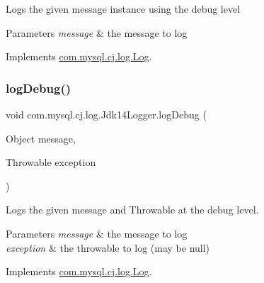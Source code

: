 Logs the given message instance using the \textquotesingle{}debug\textquotesingle{} level


\begin{DoxyParams}{Parameters}
{\em message} & the message to log \\
\hline
\end{DoxyParams}


Implements \mbox{\hyperlink{interfacecom_1_1mysql_1_1cj_1_1log_1_1_log_a6149f715730ea0615ef6e341dd3e8a39}{com.\+mysql.\+cj.\+log.\+Log}}.

\mbox{\label{classcom_1_1mysql_1_1cj_1_1log_1_1_jdk14_logger_a3be3b804fac31009afe4dcbc9a399027}} 
\subsubsection{\texorpdfstring{log\+Debug()}{logDebug()}\hspace{0.1cm}{\footnotesize\ttfamily [2/2]}}
{\footnotesize\ttfamily void com.\+mysql.\+cj.\+log.\+Jdk14\+Logger.\+log\+Debug (\begin{DoxyParamCaption}\item[{Object}]{message,  }\item[{Throwable}]{exception }\end{DoxyParamCaption})}

Logs the given message and Throwable at the \textquotesingle{}debug\textquotesingle{} level.


\begin{DoxyParams}{Parameters}
{\em message} & the message to log \\
\hline
{\em exception} & the throwable to log (may be null) \\
\hline
\end{DoxyParams}


Implements \mbox{\hyperlink{interfacecom_1_1mysql_1_1cj_1_1log_1_1_log_a42c9900bc643b771d7e337686ac4f799}{com.\+mysql.\+cj.\+log.\+Log}}.

\mbox{\label{classcom_1_1mysql_1_1cj_1_1log_1_1_jdk14_logger_ab800a4f68be1be1e0e90581ea6239506}} 
